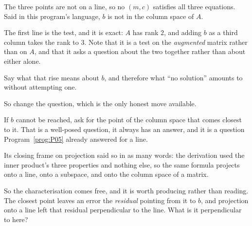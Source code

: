 \begin{fr}
The three points are not on a line, so no $(m, c)$ satisfies all three
equations. Said in this program's language, $b$ is not in the column space of
$A$.


The first line is the test, and it is exact: $A$ has rank $2$, and adding $b$
as a third column takes the rank to $3$. Note that it is a test on the
\emph{augmented} matrix rather than on $A$, and that it asks a question about
the two together rather than about either alone.

Say what that rise means about $b$, and therefore what \enquote{no solution}
amounts to without attempting one.
\dotline
\nextframe
\end{fr}

\begin{fr}
So change the question, which is the only honest move available.

If $b$ cannot be reached, ask for the point of the column space that comes
closest to it. That is a well-posed question, it always has an answer, and it
is a question Program~\ref{prog:P05} already answered \dash{} for a line.

Its closing frame on projection said so in as many words: the derivation used
the inner product's three properties and nothing else, so the same formula
projects onto a line, onto a subspace, and onto the column space of a matrix.

So the characterisation comes free, and it is worth producing rather than
reading. The closest point leaves an error \dash{} the \emph{residual} \dash{}
pointing from it to $b$, and projection onto a line left that residual
perpendicular to the line. What is it perpendicular to here?
\dotline
\nextframe
\end{fr}

